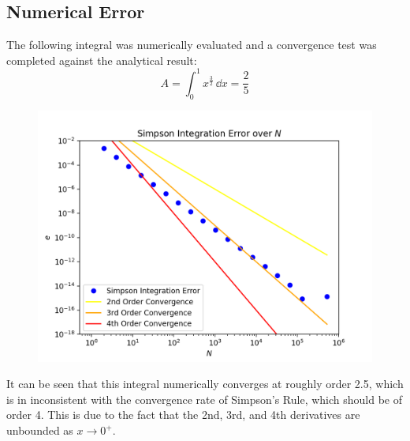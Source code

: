 \documentclass[10pt, reqno]{amsart}
\begin{document}
\begin{multicols}{2}
    \section{Numerical Error}
    The following integral was numerically evaluated and a convergence test was completed against the analytical result:
    \begin{equation}
        A = \int_0^1 x^{\frac{3}{2}} \,\dd x = \frac{2}{5}
    \end{equation}
    \begin{figure}[H]
        \centering
        \includegraphics[width=1\linewidth]{Simpson Integration Error over N.png}
    \end{figure}
    It can be seen that this integral numerically converges at roughly order 2.5, which is in inconsistent with the convergence rate of Simpson's Rule, which should be of order 4. This is due to the fact that the 2nd, 3rd, and 4th derivatives are unbounded as $x \to 0^+$.


\end{multicols}
\end{document}
